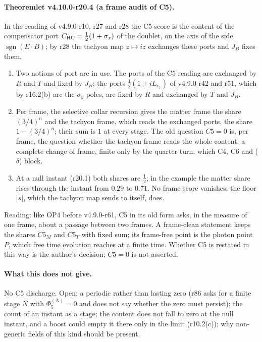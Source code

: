 \paragraph{Theoremlet v4.10.0-r20.4 (a frame audit of C5).}
In the reading of v4.9.0-r10, r27 and r28 the C5 score is the content of the compensator port \(C_{\rm HC}=\tfrac12(1+\sigma_x)\) of the
doublet, on the axis of the side \(\operatorname{sgn}(E\cdot B)\); by r28 the tachyon map \(z\mapsto iz\) exchanges these ports and \(J_B\) fixes them.
\begin{enumerate}[leftmargin=2em]
\item[(a)] Two notions of port are in use.  The ports of the C5 reading are exchanged by \(R\) and \(T\) and fixed by \(J_B\); the ports
\(\tfrac12(1\pm iL_{e_7})\) of v4.9.0-r42 and r51, which by r16.2(b) are the \(\sigma_y\) poles, are fixed by \(R\) and exchanged by \(T\) and \(J_B\).
\item[(b)] Per frame, the selective collar recursion gives the matter frame the share \((3/4)^n\) and the tachyon frame, which reads the
exchanged ports, the share \(1-(3/4)^n\); their sum is \(1\) at every stage.  The old question \(C5=0\) is, per frame, the question whether the
tachyon frame reads the whole content: a complete change of frame, finite only by the quarter turn, which C4, C6 and (\(\delta\)) block.
\item[(c)] At a null instant (r20.1) both shares are \(\tfrac12\); in the example the matter share rises through the instant from \(0.29\) to
\(0.71\).  No frame score vanishes; the floor \(|s|\), which the tachyon map sends to itself, does.
\end{enumerate}
Reading: like OP4 before v4.9.0-r61, C5 in its old form asks, in the measure of one frame, about a passage between two frames.  A
frame-clean statement keeps the shares \(C5_M\) and \(C5_T\) with fixed sum; its frame-free point is the photon point \(P\), which free time
evolution reaches at a finite time.  Whether C5 is restated in this way is the author's decision; \(C5=0\) is not asserted.

\paragraph{What this does not give.}
No C5 discharge.  Open: a periodic rather than lasting zero (r86 asks for a finite stage \(N\) with \(\Phi_5^{(N)}=0\) and does not say
whether the zero must persist); the count of an instant as a stage; the content does not fall to zero at the null instant, and a boost
could empty it there only in the limit (r10.2(c)); why non-generic fields of this kind should be present.

